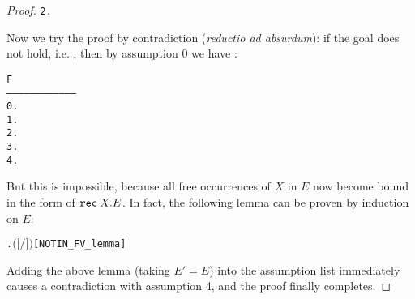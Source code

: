 \begin{proof}
\begin{alltt}
    2.  
\end{alltt}
Now we try the proof by contradiction (\emph{reductio ad absurdum}): if
the goal does not hold, i.e.
, then by assumption 0 we have :
\begin{alltt}
        F
   ------------------------------------
    0.  
    1.  
    2.  
    3.  
    4.  
\end{alltt}
But this is impossible, because all free occurrences of $X$ in $E$ now become
bound in the form of ${\tt rec}\: X . E$. In fact, the following lemma can be
proven by induction on $E$:
\begin{alltt}
\HOLTokenTurnstile{} \HOLSymConst{\HOLTokenForall{}}  .  \HOLSymConst{\HOLTokenNotIn{}}  \ensuremath{(}\ensuremath{[}  \ensuremath{/}\ensuremath{]} \ensuremath{)}\hfill{[NOTIN_FV_lemma]}
\end{alltt}
Adding the above lemma (taking $E' = E$) into the assumption list immediately causes
a contradiction with assumption 4, and the proof finally completes.
\end{proof}

